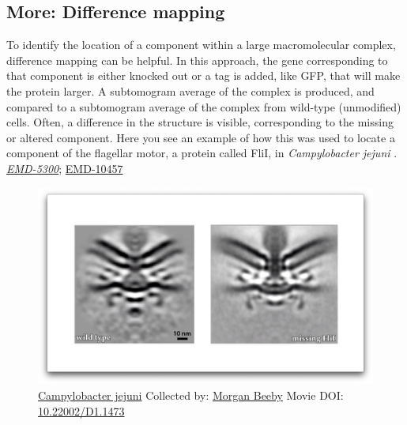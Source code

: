 \documentclass[]{tufte-book}
\begin{document}
\hypertarget{Difference_mapping}{\subsection*{More: Difference
mapping}\label{Difference_mapping}}

To identify the location of a component within a large macromolecular
complex, difference mapping can be helpful. In this approach, the gene
corresponding to that component is either knocked out or a tag is added,
like GFP, that will make the protein larger. A subtomogram average of
the complex is produced, and compared to a subtomogram average of the
complex from wild-type (unmodified) cells. Often, a difference in the
structure is visible, corresponding to the missing or altered component.
Here you see an example of how this was used to locate a component of
the flagellar motor, a protein called FliI, in \emph{Campylobacter
jejuni} \citep{henderson2020}.
\href{https://www.ebi.ac.uk/pdbe/entry/emdb/emd-5300}{\emph{EMD-5300}};
\href{https://www.ebi.ac.uk/pdbe/entry/emdb/emd-10457}{EMD-10457}





\begin{figure}
\includegraphics{movie_stills/1_10a} \caption[\protect\hyperlink{tree}{Campylobacter jejuni} Collected by:
\protect\hyperlink{morgan_beeby}{Morgan Beeby} Movie DOI:
\href{https://doi.org/10.22002/D1.1473}{10.22002/D1.1473}]{\protect\hyperlink{tree}{Campylobacter jejuni} Collected by:
\protect\hyperlink{morgan_beeby}{Morgan Beeby} Movie DOI:
\href{https://doi.org/10.22002/D1.1473}{10.22002/D1.1473}}\label{fig:1-10a}
\end{figure}
\end{document}
